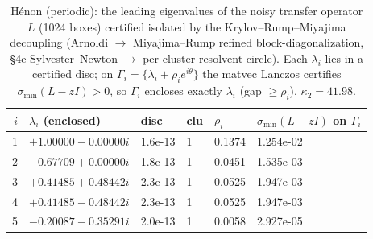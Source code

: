 \begin{table}[h]\centering\begin{tabular}{r l l l l l}\toprule
$i$ & $\lambda_i$ (enclosed) & disc & clu & $\rho_i$ & $\sigma_{\min}(L-zI)$ on $\Gamma_i$ \\\midrule
1 & $+1.00000-0.00000i$ & 1.6e-13 & 1 & 0.1374 & 1.254e-02 \\
2 & $-0.67709+0.00000i$ & 1.8e-13 & 1 & 0.0451 & 1.535e-03 \\
3 & $+0.41485+0.48442i$ & 2.3e-13 & 1 & 0.0525 & 1.947e-03 \\
4 & $+0.41485-0.48442i$ & 2.3e-13 & 1 & 0.0525 & 1.947e-03 \\
5 & $-0.20087-0.35291i$ & 2.0e-13 & 1 & 0.0058 & 2.927e-05 \\
\bottomrule\end{tabular}
\caption{Hénon (periodic): the leading eigenvalues of the noisy transfer operator $L$ (1024 boxes) certified isolated by the Krylov--Rump--Miyajima decoupling (Arnoldi $\to$ Miyajima--Rump refined block-diagonalization, \S4e Sylvester--Newton $\to$ per-cluster resolvent circle). Each $\lambda_i$ lies in a certified disc; on $\Gamma_i=\{\lambda_i+\rho_i e^{i\theta}\}$ the matvec Lanczos certifies $\sigma_{\min}(L-zI)>0$, so $\Gamma_i$ encloses exactly $\lambda_i$ (gap $\ge\rho_i$). $\kappa_2=41.98$.}
\end{table}
